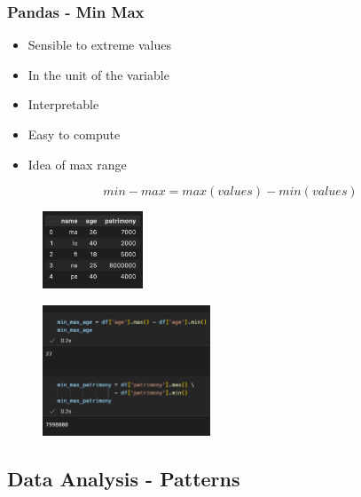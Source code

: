 \begin{frame}\frametitle{Pandas - Min Max}
   \begin{minipage}{0.58\linewidth}
      \begin{itemize}
         \item Sensible to extreme values
         \item In the unit of the variable
         \item Interpretable
         \item Easy to compute
         \item Idea of max range
      \end{itemize}
      \vspace{.5cm}
      $$min-max = max(values) - min(values)$$
      \begin{figure}[H]
         \includegraphics[width=3cm]{../images/illustrations/data_analysis_df_2.png}
      \end{figure}
   \end{minipage}
   \begin{minipage}{0.38\linewidth}
      \begin{figure}[H]
         \includegraphics[width=5cm]{../images/illustrations/min_max.png}
      \end{figure}
   \end{minipage}
\end{frame}



\subsection{Data Analysis - Patterns}

